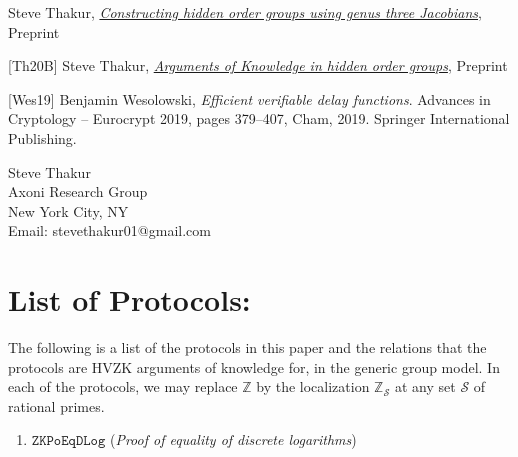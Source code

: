 \documentclass[11pt, lettersize, notitlepage, leqno, footskip=0.6cm]{article}
\newcommand{\bz}{\mathbb Z}
\newcommand{\ttt}{\texttt}
\newcommand{\mc}{\mathcal}
\newcommand{\noin}{\noindent}
\numberwithin{equation}{section}
\begin{document}
{{{%

\noin [Th20A] Steve Thakur, \href{https://eprint.iacr.org/2020/348}{\textit{Constructing hidden order groups using genus three Jacobians}}, Preprint \vspace{0.1cm}

\noin \hypertarget{Th20}{[Th20B]} Steve Thakur, \href{https://eprint.iacr.org/2020/1617}{\textit{Arguments of Knowledge in hidden order groups}}, Preprint \vspace{0.1cm} 


\noin \hypertarget{Wes18}{[Wes19]} Benjamin Wesolowski, \textit{Efficient verifiable delay functions}. Advances in Cryptology – Eurocrypt 2019, pages 379–407, Cham, 2019. Springer International Publishing.\vspace{0.1cm}




\bigskip

\normalsize

\noin Steve Thakur\\
Axoni Research Group\\
New York City, NY\\
Email: stevethakur01@gmail.com 


\newpage

\appendix

\section{\fontsize{11}{11}\selectfont List of Protocols:}

\hypertarget{List}{The following is a list of the protocols in this paper and the relations that the protocols are HVZK arguments of knowledge for, in the generic group model. In each of the protocols, we may replace $\bz$ by the localization $\bz_{\mc{S}}$ at any set $\mc{S}$ of rational primes.}

\begin{enumerate}[wide, labelwidth=!, labelindent=0pt]

\item $\ttt{ZKPoEqDLog}$ (\textit{Proof of equality of discrete logarithms}) \vspace{-0.3cm}


\end{enumerate}}}}
\end{document}
